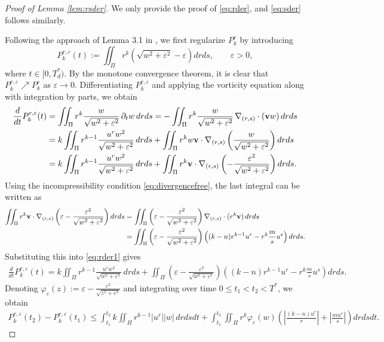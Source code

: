 \documentclass[11pt]{amsart}
\theoremstyle{definition}
\theoremstyle{remark}
\numberwithin{equation}{section}
\numberwithin{equation}{section}
\newcommand{\0}{\emptyset}
\newcommand{\bfv}{{\bf v}}
\begin{document}
	\begin{proof}[Proof of Lemma \ref{lem:rsder}]
		We only provide the proof of \eqref{eq:rder}, and \eqref{eq:sder} follows similarly. 
		
		Following the approach of Lemma 3.1 in \cite{EYao25}, we first regularize $P^r_k$ by introducing 
		\[ P^{r,\varepsilon}_{k}(t) := \iint_{\Pi} r^k \left( \sqrt{w^2+\varepsilon^2}-\varepsilon \right) drds, \qquad \varepsilon>0, \] where $t\in [0,T^{*}_d)$.
		By the monotone convergence theorem, it is clear that $P^{r,\varepsilon}_k \nearrow P^r_k$ as $\varepsilon \to 0$. Differentiating $P^{r,\varepsilon}_k$ and applying the vorticity equation along with integration by parts, we obtain
		\begin{align} \label{eq:rder1}
			\begin{split}
				\frac{d}{dt} P^{r,\varepsilon}_k (t) &= \iint_{\Pi} r^{k} \frac{w}{\sqrt{w^2+\varepsilon^2}}\, \partial_tw \, drds = -\iint_{\Pi} r^{k} \frac{w}{\sqrt{w^2+			\varepsilon^2}} \, \nabla_{(r,s)} \cdot (\bfv w) \, drds \\
				&= k \iint_{\Pi} r^{k-1} \frac{u^rw^2}{\sqrt{w^2+\varepsilon^2}} \, drds + \iint_{\Pi} r^{k} w \bfv\cdot \nabla_{(r,s)} \left( \frac{w}{\sqrt{w^2+	\varepsilon^2}} \right) drds \\
				&=  k \iint_{\Pi} r^{k-1} \frac{u^rw^2}{\sqrt{w^2+\varepsilon^2}} \, drds + \iint_{\Pi} r^{k}\bfv \cdot \nabla_{(r,s)} \left(- \frac{\varepsilon^2}{\sqrt{w^2+\varepsilon^2}} \right) drds.		 
			\end{split}
		\end{align}
		Using the incompressibility condition \eqref{eq:divergencefree}, the last integral can be written as
		\begin{align*}
			\iint_{\Pi} r^{k}\bfv \cdot \nabla_{(r,s)} \left(\varepsilon -  \frac{\varepsilon^2}{\sqrt{w^2+\varepsilon^2}} \right) drds &= \iint_{\Pi} \left( \varepsilon - \frac{\varepsilon^2}{\sqrt{w^2+\varepsilon^2}} \right) \nabla_{(r,s)} \cdot (r^k\bfv) \, drds \\
			&= \iint_{\Pi} \left( \varepsilon - \frac{\varepsilon^2}{\sqrt{w^2+\varepsilon^2}}\right) \left( (k-n)r^{k-1}u^r - r^k\frac{m}{s}u^s \right) drds. 
		\end{align*}
		Substituting this into \eqref{eq:rder1} gives
		\begin{align*}
			\frac{d}{dt} P^{r,\varepsilon}_k (t) = k \iint_{\Pi} r^{k-1} \frac{u^rw^2}{\sqrt{w^2+\varepsilon^2}} \, drds + \iint_{\Pi} \left(\varepsilon - \frac{\varepsilon^2}{\sqrt{w^2+\varepsilon^2}}\right) \left( (k-n)r^{k-1}u^r - r^k\frac{m}{s}u^s \right) drds. 
		\end{align*}
		Denoting $\varphi_{\varepsilon}(z):=\varepsilon - \frac{\varepsilon^2}{\sqrt{z^2+\varepsilon^2}}$ and integrating over time $0\le t_1 < t_2<T^{*}$, we obtain
		\begin{align*}
			P^{r,\varepsilon}_k (t_2) - P^{r,\varepsilon}_k (t_1) \le \int_{t_1}^{t_2} \!k \! \iint_{\Pi} r^{k-1} |u^r||w|\, drds dt + \int_{t_1}^{t_2} \! \iint_{\Pi} r^k \varphi_{\varepsilon}(w) \left( \left|\frac{(k-n)u^r}{r}\right| + \left|\frac{mu^s}{s}\right| \right) drds dt.
		\end{align*}
				

\end{proof}
\end{document}
